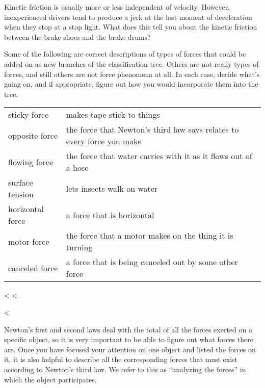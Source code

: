 \begin{dq}
Kinetic friction is usually more or less independent of
velocity. However, inexperienced drivers tend to produce a
jerk at the last moment of deceleration when they stop at a
stop light. What does this tell you about the kinetic
friction between the brake shoes and the brake drums?
\end{dq}

\begin{dq}
Some of the following are correct descriptions of types
of forces that could be added on as new branches of the
classification tree. Others are not really types of forces,
and still others are not force phenomena at all. In each
case, decide what's going on, and if appropriate, figure out
how you would incorporate them into the tree.

\begin{tabular}{lp{80mm}}
sticky force       & makes tape stick to things\\
opposite force      & the force that Newton's third law says
                       relates to every force you make\\
flowing force      & the force that water carries with it as
it flows out of a hose\\
surface tension    & lets insects walk on water\\
horizontal force   &  a force that is horizontal\\
motor force        & the force that a motor makes on the thing it is turning\\
canceled force     & a force that is being canceled out by some other force
\end{tabular}
\end{dq}

<%
<%

\vspace{20mm}

<%

Newton's first and second laws deal with the total of all
the forces exerted on a specific object, so it is very
important to be able to figure out what forces there are.
Once you have focused your attention on one object and
listed the forces on it, it is also helpful to describe all
the corresponding forces that must exist according to
Newton's third law. We refer to this as ``analyzing the
forces'' in which the object participates.

